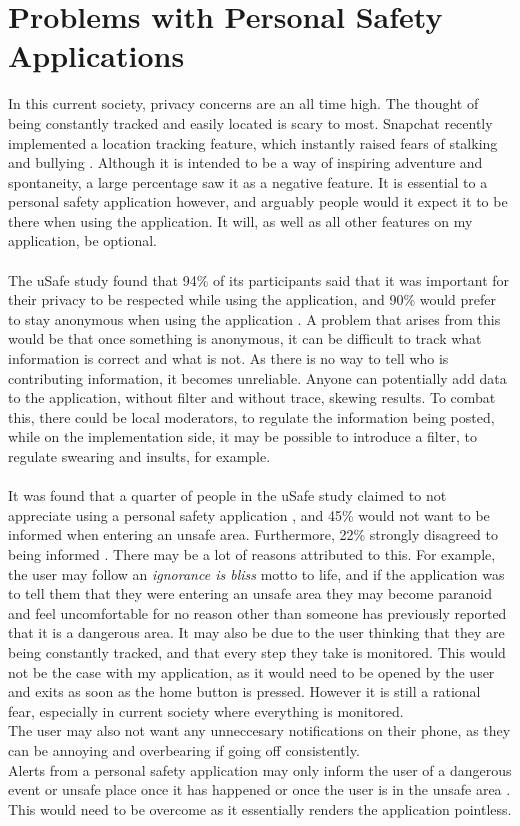 \documentclass[a4paper]{report}
\begin{document}
\section{Problems with Personal Safety Applications}
\label{sec:ProblemsWithPSA}
In this current society, privacy concerns are an all time high. The thought of being constantly tracked and easily located is scary to most. Snapchat recently implemented a location
tracking feature, which instantly raised fears of stalking and bullying \cite{snapchat}. Although it is intended to be a way of inspiring adventure and
spontaneity, a large percentage saw it as a negative feature. It is essential to a personal safety application however, and arguably people would it expect it to be there when using the
application. It will, as well as all other features on my application, be optional. \\ \\The uSafe study found that 94\% of its participants said that it was important for their privacy
to be respected while using the application, and 90\% would prefer to stay anonymous when using the application \cite{usafepaper}. A problem that arises from this would be that
once something is anonymous, it can be difficult to track what information is correct and what is not. As there is no way to tell who is contributing information, it becomes unreliable. Anyone can
potentially add data to the application, without filter and without trace, skewing results. To combat this, there could be local moderators, to regulate the information being posted, while on the implementation side,
it may be possible to introduce a filter, to regulate swearing and insults, for example.
\\  \\It was found that a quarter of people in the uSafe study claimed to not appreciate using a personal safety application \cite{usafepaper}, and 45\% would not want
to be informed when entering an unsafe area. Furthermore, 22\% strongly disagreed to being informed \cite{usafepaper}. There may be a lot of reasons attributed to this. For example, the user may follow an \textit{ignorance is bliss} motto to life, and if the application was to tell them that they were entering an unsafe area
they may become paranoid and feel uncomfortable for no reason other than someone has previously reported that it is a dangerous area. It may also be due to the user thinking
that they are being constantly tracked, and that every step they take is monitored. This would not be the case with my application, as it would need to be opened by the user and exits as soon as the home button
is pressed. However it is still a rational fear, especially in current society where everything is monitored. \\ The user may also not want any unneccesary notifications on their phone, as they can be annoying
and overbearing if going off consistently.
\\Alerts from a personal safety application may only inform the user of a dangerous event or unsafe place once it has happened or once the user is in the
unsafe area \cite{onthespot}. This would need to be overcome as it essentially renders the application pointless.
\end{document}
